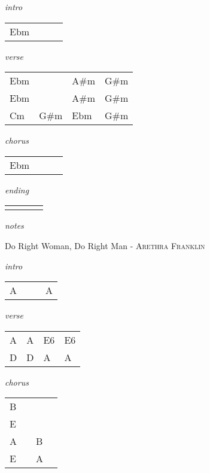 \documentclass[12pt]{article}
\begin{document}
\huge
\textit{intro}

\begin{tabular}{|P{1.25in}|P{1.25in}|P{1.25in}|P{1.25in}|}
  Ebm &   &   &   \\
\end{tabular}

\textit{verse}

\begin{tabular}{|P{1.25in}|P{1.25in}|P{1.25in}|P{1.25in}|}
  Ebm &   & A\#m  & G\#m  \\
  Ebm &   & A\#m  & G\#m  \\
  Cm  &  G\#m & Ebm & G\#m \\
\end{tabular}

\textit{chorus}

\begin{tabular}{|P{1.25in}|P{1.25in}|P{1.25in}|P{1.25in}|}
  Ebm &   &   &   \\
\end{tabular}

\textit{ending}

\begin{tabular}{|P{1.25in}|P{1.25in}|P{1.25in}|P{1.25in}|}
   &   &   &   \\
\end{tabular}

\textit{notes}

\newpage

{\Huge Do Right Woman, Do Right Man} {\huge - \textsc{Arethra Franklin}}

\huge
\textit{intro}

\begin{tabular}{|P{1.25in}|P{1.25in}|P{1.25in}|P{1.25in}|}
  A &   &   &  A \\

\end{tabular}

\textit{verse}

\begin{tabular}{|P{1.25in}|P{1.25in}|P{1.25in}|P{1.25in}|}
  A & A  &  E6 &  E6 \\
  D & D  &  A &  A \\
\end{tabular}

\textit{chorus}

\begin{tabular}{|P{1.25in}|P{1.25in}|P{1.25in}|P{1.25in}|}
  B &   &   &   \\
  E &   &   &   \\
\hline
  A &   &  B &  \\
  E &   &  A &   \\
\end{tabular}
\end{document}
